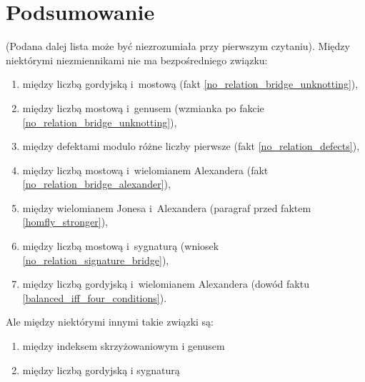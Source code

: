 













\section{Podsumowanie}
(Podana dalej lista może być niezrozumiała przy pierwszym czytaniu).
Między niektórymi niezmiennikami nie ma bezpośredniego związku:
\begin{enumerate}
    \item między liczbą gordyjską i~mostową (fakt \ref{no_relation_bridge_unknotting}),
    \item między liczbą mostową i~genusem (wzmianka po fakcie \ref{no_relation_bridge_unknotting}),
    \item między defektami modulo różne liczby pierwsze (fakt \ref{no_relation_defects}),
    \item między liczbą mostową i~wielomianem Alexandera (fakt \ref{no_relation_bridge_alexander}),
    \item między wielomianem Jonesa i~Alexandera (paragraf przed faktem \ref{homfly_stronger}),
    \item między liczbą mostową i~sygnaturą (wniosek \ref{no_relation_signature_bridge}),
    \item między liczbą gordyjską i~wielomianem Alexandera (dowód faktu \ref{balanced_iff_four_conditions}).
\end{enumerate}

Ale między niektórymi innymi takie związki są:
\begin{enumerate}
    \item między indeksem skrzyżowaniowym i genusem %
    \item między liczbą gordyjską i sygnaturą %
\end{enumerate}


